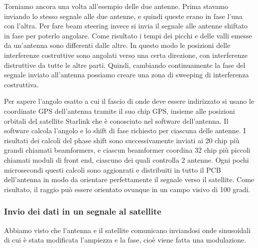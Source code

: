 Torniamo ancora una volta all'esempio delle due antenne.
Prima stavamo inviando lo stesso segnale alle due antenne, e quindi queste erano in fase l'una con l'altra.
Per fare beam steering invece si invia il segnale alle antenne shiftato in fase per poterlo angolare.
Come risultato i tempi dei picchi e delle valli emesse da un'antenna sono differenti dalle altre.
In questo modo le posizioni delle interferenze costruttive sono angolati verso una certa direzione, con interferenze distruttive da tutte le altre parti.
Quindi, cambiando continuamente la fase del segnale inviato all'antenna possiamo creare una zona di sweeping di interferenza costruttiva.

Per sapere l'angolo esatto a cui il fascio di onde deve essere indirizzato si usano le coordinate GPS dell'antenna tramite il suo chip GPS, insieme alle posizioni orbitali del satellite Starlink che è conosciuto nel software dell'antenna.
Il software calcola l'angolo e lo shift di fase richiesto per ciascuna delle antenne.
I risultati dei calcoli del phase shift sono successivamente inviati ai 20 chip più grandi chiamati beamformers, e ciascun beamformer coordina 32 chip più piccoli chiamati moduli di front end, ciascuno dei quali controlla 2 antenne.
Ogni pochi microsecondi questi calcoli sono aggionrati e distribuiti in tutto il PCB dell'antenna in modo da orientare perfettamente il segnale verso il satellite.
Come risultato, il raggio può essere orientato ovunque in un campo visivo di 100 gradi.\cite{branch_education_how_2022}


\subsubsection{Invio dei dati in un segnale al satellite}
Abbiamo visto che l'antenna e il satellite comunicano inviandosi onde sinusoidali di cui è stata modificata l'ampiezza e la fase, cioè viene fatta una modulazione.

